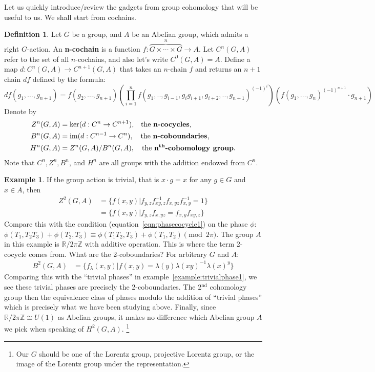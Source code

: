 \documentclass[10pt]{article}
\newcommand{\bZ}{\mathbb Z}
\newcommand{\bR}{\mathbb{R}}
\theoremstyle{plain}
\theoremstyle{definition}
\newtheorem{defn}{Definition}
\newtheorem{example}{Example}
\theoremstyle{remark}
\newcommand{\lam}{\lambda}
\begin{document}
Let us quickly introduce/review the gadgets from group cohomology that
will be useful to us. We shall start from cochains.
\begin{defn}
    Let $G$ be a group, and $A$ be an Abelian group, which admits a
    right $G$-action. An \mbox{\textbf{n-cochain}} is a function 
    \mbox{$f:\overbrace{G\times\cdots\times G}^n\to A$}. 
    Let $C^n(G,A)$ refer to the set of all $n$-cochains, and also
    let's write $C^0(G,A) = A$.
    Define a map $d:C^n(G,A)\to C^{n+1}(G,A)$ that takes an $n$-chain
    $f$ and returns an $n+1$ chain $df$ defined by the formula:
    \[ df(g_1,\dots,g_{n+1})
        = f(g_2,\dots,g_{n+1}) 
        \left(
        \prod_{i=1}^{n} f(g_1,..,g_{i-1},g_ig_{i+1},g_{i+2},..,g_{n+1})^{(-1)^i}
        \right)
        (f(g_1,\dots,g_{n})^{(-1)^{n+1}}\cdot g_{n+1})
    \]
    Denote by 
    \vspace{-.5cm}
    \begin{align*}
    Z^n(G,A) &= \ker(d:C^n\to C^{n+1}),         \quad\!\text{the \textbf{n-cocycles},}\\
    B^n(G,A) &= \mathrm{im}(d:C^{n-1}\to C^n),  \quad\text{the \textbf{n-coboundaries},}\\
    H^n(G,A) &= Z^n(G,A)/B^n(G,A), \quad\text{the \textbf{n$^\text{th}$-cohomology group}.}
    \end{align*}
    Note that $C^n,Z^n,B^n$, and $H^n$ are all groups with the
    addition endowed from $C^n$.
\end{defn}
\begin{example}
If the group action is trivial, that is $x\cdot g = x$ for any
$g\in G$ and $x\in A$, then 
\begin{align*}
Z^2(G,A) 
&= \{f(x,y)| f_{y,z} f_{xy,z}^{-1} f_{x,yz} f_{x,y}^{-1} = 1\}\\
&= \{f(x,y)| f_{y,z}f_{x,yz}  = f_{x,y}f_{xy,z}\}
\end{align*}
Compare this with the condition (equation~\ref{eqn:phasecocycle1})
on the phase $\phi$: $\phi(T_1,T_2T_3) + \phi(T_2,T_3) \equiv
\phi(T_1T_2,T_3)+\phi(T_1,T_2) \pmod{2\pi}$.  The group $A$ in this
example is $\bR/2\pi\bZ$ with additive operation. This is where the
term 2-cocycle comes from. What are the 2-coboundaries? For arbitrary
$G$ and $A$:
\begin{align*}
    B^2(G,A) &= \{f_\lam(x,y) | f(x,y) = \lam(y)\lam(xy)^{-1}\lam(x)^y\}
\end{align*}
Comparing this with the ``trivial phases'' in
example~\ref{example:trivialphase1}, we see these trivial phases are
precisely the 2-coboundaries. The 2$^\text{nd}$ cohomology group then
the equivalence class of phases modulo the addition of ``trivial
phases'' which is precisely what we have been studying above.
Finally, since $\bR/2\pi\bZ\cong U(1)$ as Abelian groups, it makes no
difference which Abelian group $A$ we pick when speaking of
$H^2(G,A)$. \footnote{Our $G$ should be one of the Lorentz group,
projective Lorentz group, or the image of the Lorentz group under the
representation.}
\end{example}
\end{document}
